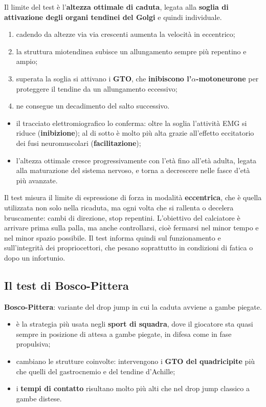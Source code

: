 Il limite del test è l'\textbf{altezza ottimale di caduta}, legata alla \textbf{soglia di
attivazione degli organi tendinei del Golgi} e quindi individuale.
\begin{enumerate}
  \item cadendo da altezze via via crescenti aumenta la velocità in eccentrico;
  \item la struttura miotendinea subisce un allungamento sempre più repentino e ampio;
  \item superata la soglia si attivano i \textbf{GTO}, che \textbf{inibiscono
    l'$\alpha$-motoneurone}
    per proteggere il tendine da un allungamento eccessivo;
  \item ne consegue un decadimento del salto successivo.
\end{enumerate}

\begin{itemize}
  \item il tracciato elettromiografico lo conferma: oltre la soglia l'attività EMG si riduce
    (\textbf{inibizione}); al di sotto è molto più alta grazie all'effetto eccitatorio dei fusi
    neuromuscolari (\textbf{facilitazione});
  \item l'altezza ottimale cresce progressivamente con l'età fino all'età adulta, legata alla
    maturazione del sistema nervoso, e torna a decrescere nelle fasce d'età più avanzate.
\end{itemize}

Il test misura il limite di espressione di forza in modalità \textbf{eccentrica}, che è quella
  utilizzata non solo nella ricaduta, ma ogni volta che si rallenta o decelera bruscamente: cambi di
  direzione, stop repentini. L'obiettivo del calciatore è arrivare prima sulla palla, ma anche
  controllarsi, cioè fermarsi nel minor tempo e nel minor spazio possibile. Il test informa quindi
  sul funzionamento e sull'integrità dei propriocettori, che pesano soprattutto in condizioni di
  fatica o dopo un infortunio.

\subsection{Il test di Bosco-Pittera}

\textbf{Bosco-Pittera}: variante del drop jump in cui la caduta avviene a gambe piegate.

\begin{itemize}
  \item è la strategia più usata negli \textbf{sport di squadra}, dove il giocatore sta quasi
    sempre in posizione di attesa a gambe piegate, in difesa come in fase propulsiva;
  \item cambiano le strutture coinvolte: intervengono i \textbf{GTO del quadricipite} più che
    quelli del gastrocnemio e del tendine d'Achille;
  \item i \textbf{tempi di contatto} risultano molto più alti che nel drop jump classico a gambe
    distese.
\end{itemize}

